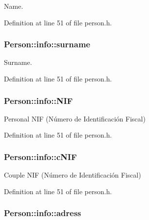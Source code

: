 Name. 



Definition at line 51 of file person.\+h.

\hypertarget{struct_person_1_1info_a5dffef4c24ab24eaa62a3428e04b4239}{
\subsubsection[{surname}]{\setlength{\rightskip}{0pt plus 5cm}Person\+::info\+::surname}}\label{struct_person_1_1info_a5dffef4c24ab24eaa62a3428e04b4239}


Surname. 



Definition at line 51 of file person.\+h.

\hypertarget{struct_person_1_1info_ab91922388b5ba74969a7d8f7a4fad95b}{
\subsubsection[{N\+I\+F}]{\setlength{\rightskip}{0pt plus 5cm}Person\+::info\+::\+N\+I\+F}}\label{struct_person_1_1info_ab91922388b5ba74969a7d8f7a4fad95b}


Personal N\+I\+F (Número de Identificación Fiscal) 



Definition at line 51 of file person.\+h.

\hypertarget{struct_person_1_1info_a3ee6bcba23c2257f4571084e7a734e6d}{
\subsubsection[{c\+N\+I\+F}]{\setlength{\rightskip}{0pt plus 5cm}Person\+::info\+::c\+N\+I\+F}}\label{struct_person_1_1info_a3ee6bcba23c2257f4571084e7a734e6d}


Couple N\+I\+F (Número de Identificación Fiscal) 



Definition at line 51 of file person.\+h.

\hypertarget{struct_person_1_1info_a350817c964e878c2c59019eb51e9f608}{
\subsubsection[{adress}]{\setlength{\rightskip}{0pt plus 5cm}Person\+::info\+::adress}}\label{struct_person_1_1info_a350817c964e878c2c59019eb51e9f608}


